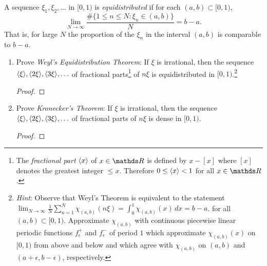 \documentclass{../homework}
\begin{document}
\begin{Exercise}
  A sequence \(\xi_1,\xi_2,\ldots\) in \([0,1)\) is
  \emph{equidistributed} if for each \((a,b) \subset [0,1)\),
  \[
    \lim_{N \to \infty}
    \frac{\#\{1 \leq n \leq N : \xi_n \in (a,b)\}}{N} = b-a.
  \]
  That is, for large \(N\) the proportion of the \(\xi_n\) in the
  interval \((a,b)\) is comparable to \(b-a\).
  \begin{enumerate}
  \item Prove \emph{Weyl's Equidistribution Theorem}: If \(\xi\) is
    irrational, then the sequence
    \(\langle {\xi} \rangle, \langle {2\xi} \rangle, \langle {3 \xi} \rangle, \ldots\) of fractional
    parts\footnote{The \emph{fractional part} \(\langle {x} \rangle\) of
      \(x \in \R\) is defined by \(x - [x]\) where \([x]\) denotes the
      greatest integer \(\leq x\).  Therefore \(0 \leq \langle {x} \rangle < 1\)
      for all \(x \in \R\).}  of \(n\xi\) is equidistributed in
    \([0,1)\).\footnote{\emph{Hint}: Observe that Weyl's Theorem is
      equivalent to the statement
      \( \lim_{N\to\infty} \frac{1}{N} \sum_{n=1}^N \chi_{(a,b)}(n
      \xi) = \int_0^1 \chi_{(a,b)}(x)\,dx = b-a\).  for all
      \((a,b) \subset [0,1)\).  Approximate \(\chi_{(a,b)}\) with
      continuous piecewise linear periodic functions
      \(f_{\epsilon}^+\) and \(f_{\epsilon}^-\) of period \(1\) which
      approximate \(\chi_{(a,b)}(x)\) on \([0,1)\) from above and
      below and which agree with \(\chi_{(a,b)}\) on \((a,b)\) and
      \((a+ \epsilon, b- \epsilon)\), respectively.}

    \begin{solution}
      \begin{proof}

      \end{proof}
    \end{solution}

  \item Prove \emph{Kronecker's Theorem}: If \(\xi\) is irrational,
    then the sequence
    \(\langle {\xi} \rangle, \langle {2\xi} \rangle, \langle {3 \xi} \rangle, \ldots\) of fractional
    parts of \(n\xi\) is dense in \([0,1)\).

    \begin{solution}
      \begin{proof}

      \end{proof}
    \end{solution}

  \end{enumerate}
\end{Exercise}
\end{document}
